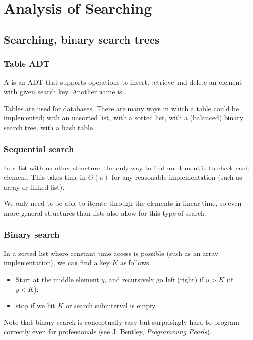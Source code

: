 \part{Analysis of Searching}  
\label{ch:effsearch}

\chapter{Searching, binary search trees} %

\section{Table ADT}
\begin{Definition}
A  is an ADT that supports operations to insert, retrieve and delete an element
with given search key. Another name is .
\end{Definition}
Tables are used for databases. There are  many ways in which a table could be implemented;
with an unsorted list, with a sorted list, with a (balanced) binary search tree, with a hash table.

\section{Sequential search}
In a list with no other structure, the only way to find an element is to check each element. 
This takes time in $\Theta(n)$ for any reasonable implementation (such as array or linked list).

We only need to be able to iterate through the elements in linear time, 
so even more general structures than lists also allow for this type of search.

\section{Binary search}
In a sorted list where constant time access is possible (such as an array implementation), 
we can find a key $K$ as follows.
\begin{itemize}
  \item Start at the middle element $y$, and recursively go left (right) if $y > K$ (if $y < K$);
  \item stop if we hit  $K$ or search subinterval is empty.
\end{itemize}

Note that binary search is conceptually easy but surprisingly hard to program
correctly even for professionals (see J. Bentley, \emph{Programming Pearls}).

